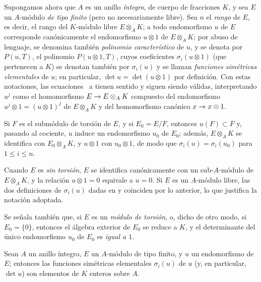 \documentclass[oneside,10pt]{amsart}
\makeatletter
\renewcommand{\leq}{\leqslant}
\newcommand{\ega@arrow}[2]{\mathchoice{#1}{#2}{#2}{#2}}
\renewcommand{\to}{\ega@arrow{\longrightarrow}{\rightarrow}}
\let\EGAOriginalLabel\label
\renewcommand{\label}[1]{\phantomsection\EGAOriginalLabel{#1}}
\makeatother
\begin{document}
\begin{env}[6.4.2]
\label{II.6.4.2-fr}
Supongamos ahora que $A$ es un anillo \emph{íntegro}, de cuerpo de fracciones $K$, y sea $E$ un $A$-módulo \emph{de tipo finito} (pero no necesariamente libre).
Sea $n$ el \emph{rango} de $E$, es decir, el rango del $K$-módulo libre $E\otimes_AK$;
a todo endomorfismo $u$ de $E$ corresponde canónicamente el endomorfismo $u\otimes1$ de $E\otimes_AK$;
por abuso de lenguaje, se denomina también \emph{polinomio característico} de $u$, y se denota por $P(u,T)$, el polinomio $P(u\otimes1,T)$, cuyos coeficientes $\sigma_i(u\otimes1)$ (que pertenecen a $K$) se denotan también por $\sigma_i(u)$ y se llaman \emph{funciones simétricas elementales} de $u$;
en particular, $\det u=\det(u\otimes1)$ por definición.
Con estas notaciones, las ecuaciones~ a  tienen sentido y siguen siendo válidas, interpretando $u^j$ como el homomorfismo
$E\to E\otimes_AK$ compuesto del endomorfismo $u^j\otimes1=(u\otimes1)^j$ de $E\otimes_AK$ y del homomorfismo canónico $x\to x\otimes1$.

Si $F$ es el submódulo de torsión de $E$, y si $E_0=E/F$, entonces $u(F)\subset F$ y, pasando al cociente, $u$ induce un endomorfismo $u_0$ de $E_0$;
además, $E\otimes_AK$ se identifica con $E_0\otimes_AK$, y $u\otimes1$ con $u_0\otimes1$, de modo que $\sigma_i(u)=\sigma_i(u_0)$ para $1\leq i\leq n$.

Cuando $E$ es \emph{sin torsión}, $E$ se identifica canónicamente con un sub-$A$-módulo de $E\otimes_AK$, y la relación $u\otimes1=0$ equivale a $u=0$.
Si $E$ es un $A$-módulo libre, las dos definiciones de $\sigma_i(u)$ dadas en  y  coinciden por lo anterior, lo que justifica la notación adoptada.

Se señala también que, si $E$ es un \emph{módulo de torsión}, o, dicho de otro modo, si $E_0=\{0\}$, entonces el álgebra exterior de $E_0$ se reduce a $K$, y el determinante del único endomorfismo $u_0$ de $E_0$ es \emph{igual a $1$}.
\end{env}

\begin{proposition}[6.4.3]
\label{II.6.4.3-fr}
Sean $A$ un anillo íntegro, $E$ un $A$-módulo de tipo finito, y $u$ un endomorfismo de $E$;
entonces las funciones simétricas elementales $\sigma_i(u)$ de $u$ (y, en particular, $\det u$) son elementos de $K$ enteros sobre $A$.
\end{proposition}
\end{document}
